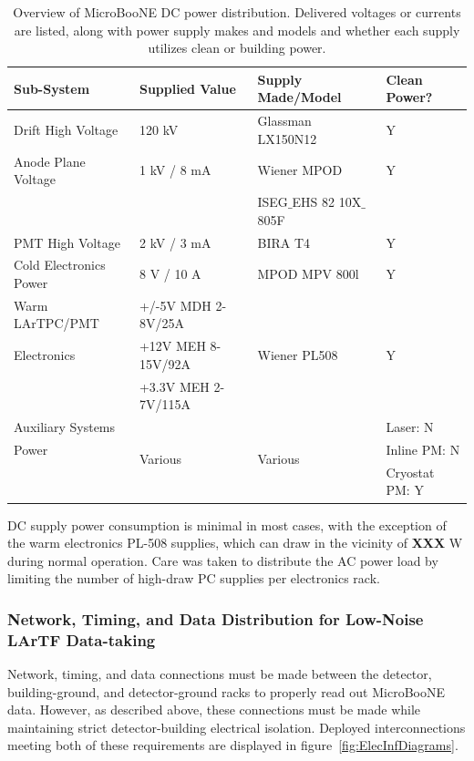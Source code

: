\begin{table}[!htb]
	\centering
	  \caption{Overview of MicroBooNE DC power distribution.  Delivered voltages or currents are listed, along with power supply makes and models and whether each supply utilizes clean or building power.}
    \begin{tabular}{|p{4.0cm}| p{4.0cm}| p{4.0cm} | p{2.5cm} | } \hline
      Sub-System & Supplied Value & Supply Made/Model & Clean Power? \\ \hline \hline
      Drift High Voltage & 120 kV & Glassman LX150N12 & Y \\ \hline
      Anode Plane Voltage & 1 kV / 8 mA & Wiener MPOD  & Y \\ 
      & & ISEG$\_$EHS 82 10X$\_$805F  &\\ \hline
      PMT High Voltage & 2 kV / 3 mA & BIRA T4 & Y \\ \hline
      Cold Electronics Power & 8 V / 10 A & MPOD MPV 800l & Y \\ \hline
      Warm LArTPC/PMT& +/-5V MDH 2-8V/25A& \multirow{3}{*}{Wiener PL508} & \multirow{3}{*}{Y}\\
       Electronics & +12V MEH 8-15V/92A & & \\ 
      & +3.3V MEH 2-7V/115A & & \\ \hline
       Auxiliary Systems & \multirow{3}{*}{Various} & \multirow{3}{*}{Various} & Laser: N \\
      Power &&& Inline PM: N \\
      &&& Cryostat PM: Y \\ \hline
  \end{tabular}
  \label{tab:DCPower}
\end{table}

DC supply power consumption is minimal in most cases, with the exception of the warm \lartpc electronics PL-508 supplies, which can draw in the vicinity of \textbf{XXX} W during normal operation.  Care was taken to distribute the AC power load by limiting the number of high-draw PC supplies per electronics rack.

\subsubsection{Network, Timing, and Data Distribution for Low-Noise LArTF Data-taking}

Network, timing, and data connections must be made between the detector, building-ground, and detector-ground racks to properly read out MicroBooNE data.  However, as described above, these connections must be made while maintaining strict detector-building electrical isolation.  Deployed interconnections meeting both of these requirements are displayed in figure~\ref{fig:ElecInfDiagrams}.

